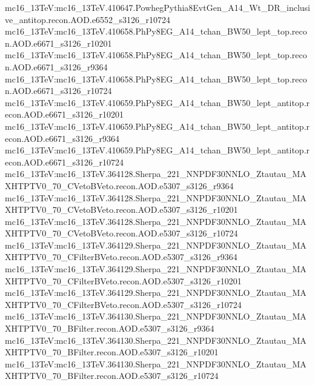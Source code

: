 { mc16\_13TeV:mc16\_13TeV.410647.PowhegPythia8EvtGen\_A14\_Wt\_DR\_inclusive\_antitop.recon.AOD.e6552\_s3126\_r10724   \newline 
 mc16\_13TeV:mc16\_13TeV.410658.PhPy8EG\_A14\_tchan\_BW50\_lept\_top.recon.AOD.e6671\_s3126\_r10201   \newline 
 mc16\_13TeV:mc16\_13TeV.410658.PhPy8EG\_A14\_tchan\_BW50\_lept\_top.recon.AOD.e6671\_s3126\_r9364   \newline
 mc16\_13TeV:mc16\_13TeV.410658.PhPy8EG\_A14\_tchan\_BW50\_lept\_top.recon.AOD.e6671\_s3126\_r10724   \newline 
 mc16\_13TeV:mc16\_13TeV.410659.PhPy8EG\_A14\_tchan\_BW50\_lept\_antitop.recon.AOD.e6671\_s3126\_r10201   \newline 
 mc16\_13TeV:mc16\_13TeV.410659.PhPy8EG\_A14\_tchan\_BW50\_lept\_antitop.recon.AOD.e6671\_s3126\_r9364   \newline 
 mc16\_13TeV:mc16\_13TeV.410659.PhPy8EG\_A14\_tchan\_BW50\_lept\_antitop.recon.AOD.e6671\_s3126\_r10724   \newline 
 mc16\_13TeV:mc16\_13TeV.364128.Sherpa\_221\_NNPDF30NNLO\_Ztautau\_MAXHTPTV0\_70\_CVetoBVeto.recon.AOD.e5307\_s3126\_r9364\newline    
 mc16\_13TeV:mc16\_13TeV.364128.Sherpa\_221\_NNPDF30NNLO\_Ztautau\_MAXHTPTV0\_70\_CVetoBVeto.recon.AOD.e5307\_s3126\_r10201 \newline   
 mc16\_13TeV:mc16\_13TeV.364128.Sherpa\_221\_NNPDF30NNLO\_Ztautau\_MAXHTPTV0\_70\_CVetoBVeto.recon.AOD.e5307\_s3126\_r10724   \newline 
 mc16\_13TeV:mc16\_13TeV.364129.Sherpa\_221\_NNPDF30NNLO\_Ztautau\_MAXHTPTV0\_70\_CFilterBVeto.recon.AOD.e5307\_s3126\_r9364   \newline 
 mc16\_13TeV:mc16\_13TeV.364129.Sherpa\_221\_NNPDF30NNLO\_Ztautau\_MAXHTPTV0\_70\_CFilterBVeto.recon.AOD.e5307\_s3126\_r10201   \newline 
 mc16\_13TeV:mc16\_13TeV.364129.Sherpa\_221\_NNPDF30NNLO\_Ztautau\_MAXHTPTV0\_70\_CFilterBVeto.recon.AOD.e5307\_s3126\_r10724 \newline   
 mc16\_13TeV:mc16\_13TeV.364130.Sherpa\_221\_NNPDF30NNLO\_Ztautau\_MAXHTPTV0\_70\_BFilter.recon.AOD.e5307\_s3126\_r9364 \newline   
 mc16\_13TeV:mc16\_13TeV.364130.Sherpa\_221\_NNPDF30NNLO\_Ztautau\_MAXHTPTV0\_70\_BFilter.recon.AOD.e5307\_s3126\_r10201   \newline 
 mc16\_13TeV:mc16\_13TeV.364130.Sherpa\_221\_NNPDF30NNLO\_Ztautau\_MAXHTPTV0\_70\_BFilter.recon.AOD.e5307\_s3126\_r10724   
}
